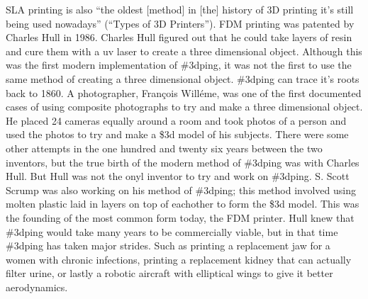 \documentclass[12pt]{article}
\begin{document}
\begin{flushleft}
SLA printing is also ``the oldest [method] in [the] history of 3D printing it’s still being used nowadays'' (``Types of 3D Printers''). FDM printing was patented by Charles Hull in 1986. Charles Hull figured out that he could take layers of resin and cure them with a uv laser to create a three dimensional object. Although this was the first modern implementation of \#3dping, it was not the first to use the same method of creating a three dimensional object. \#3dping can trace it's roots back to 1860. A photographer, Fran\c cois Will\'eme, was one of the first documented cases of using composite photographs to try and make a three dimensional object. He placed 24 cameras equally around a room and took photos of a person and used the photos to try and make a \$3d model of his subjects. There were some other attempts in the one hundred and twenty six years between the two inventors, but the true birth of the modern method of \#3dping was with Charles Hull. But Hull was not the onyl inventor to try and work on \#3dping. S. Scott Scrump was also working on his method of \#3dping; this method involved using molten plastic laid in layers on top of eachother to form the \$3d model. This was the founding of the most common form today, the FDM printer. Hull knew that \#3dping would take many years to be commercially viable, but in that time \#3dping has taken major strides. Such as printing a replacement jaw for a women with chronic infections, printing a replacement kidney that can actually filter urine, or lastly a robotic aircraft with elliptical wings to give it better aerodynamics.


\end{flushleft}
\end{document}
